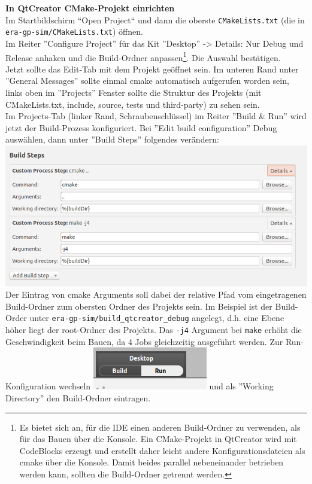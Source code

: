 \textbf{In QtCreator CMake-Projekt einrichten}\\
Im Startbildschirm ``Open Project`` und dann die oberste \texttt{CMakeLists.txt} (die in \texttt{era-gp-sim/CMakeLists.txt}) öffnen.\\
Im Reiter ''Configure Project'' für das Kit ''Desktop'' -> Details: Nur Debug und Release anhaken und die Build-Ordner anpassen\footnote{Es bietet sich an, für die IDE einen anderen Build-Ordner zu verwenden, als für das Bauen über die Konsole. Ein CMake-Projekt in QtCreator wird mit CodeBlocks erzeugt und erstellt daher leicht andere Konfigurationsdateien als cmake über die Konsole. Damit beides parallel nebeneinander betrieben werden kann, sollten die Build-Ordner getrennt werden.}. Die Auswahl bestätigen.\\
Jetzt sollte das Edit-Tab mit dem Projekt geöffnet sein. Im unteren Rand unter ''General Messages'' sollte einmal cmake automatisch aufgerufen worden sein, links oben im ''Projects'' Fenster sollte die Struktur des Projekts (mit CMakeLists.txt, include, source, tests und third-party) zu sehen sein.\\
Im Projects-Tab (linker Rand, Schraubenschlüssel) im Reiter ''Build \& Run'' wird jetzt der Build-Prozess konfiguriert.
Bei ''Edit build configuration'' Debug auswählen, dann unter ''Build Steps'' folgendes verändern:\\
\includegraphics[scale=0.5]{images/setup-qtcreator-buildrun-config.png}\\
Der Eintrag von cmake Arguments soll dabei der relative Pfad vom eingetragenen Build-Ordner zum obersten Ordner des Projekts sein. Im Beispiel ist der Build-Order unter \texttt{era-gp-sim/build\_qtcreator\_debug} angelegt, d.h. eine Ebene höher liegt der root-Ordner des Projekts. Das \texttt{-j4} Argument bei \texttt{make} erhöht die Geschwindigkeit beim Bauen, da 4 Jobs gleichzeitig ausgeführt werden.
Zur Run-Konfiguration wechseln \includegraphics[scale=1.0]{images/setup-qtcreator-run-config} und als ''Working Directory'' den Build-Ordner eintragen.\\

